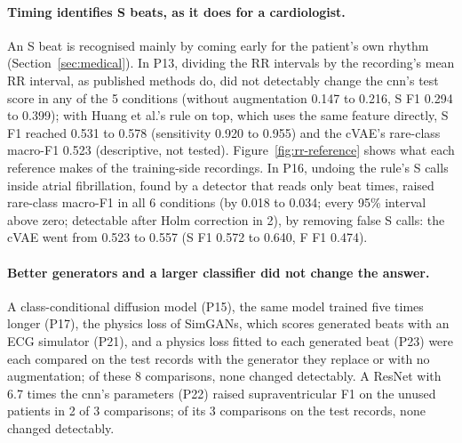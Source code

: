 \paragraph{Timing identifies S beats, as it does for a cardiologist.} An S beat is recognised mainly by coming early for the patient's own rhythm (Section~\ref{sec:medical}). In P13, dividing the RR intervals by the recording's mean RR interval, as published methods do, did not detectably change the cnn's test score in any of the 5 conditions (without augmentation 0.147 to 0.216, S F1 0.294 to 0.399); with Huang et al.'s rule on top, which uses the same feature directly, S F1 reached 0.531 to 0.578 (sensitivity 0.920 to 0.955) and the cVAE's rare-class macro-F1 0.523 (descriptive, not tested). Figure~\ref{fig:rr-reference} shows what each reference makes of the training-side recordings. In P16, undoing the rule's S calls inside atrial fibrillation, found by a detector that reads only beat times, raised rare-class macro-F1 in all 6 conditions (by 0.018 to 0.034; every 95\% interval above zero; detectable after Holm correction in 2), by removing false S calls: the cVAE went from 0.523 to 0.557 (S F1 0.572 to 0.640, F F1 0.474).

\paragraph{Better generators and a larger classifier did not change the answer.} A class-conditional diffusion model (P15), the same model trained five times longer (P17), the physics loss of SimGANs, which scores generated beats with an ECG simulator (P21), and a physics loss fitted to each generated beat (P23) were each compared on the test records with the generator they replace or with no augmentation; of these 8 comparisons, none changed detectably. A ResNet with 6.7 times the cnn's parameters (P22) raised supraventricular F1 on the unused patients in 2 of 3 comparisons; of its 3 comparisons on the test records, none changed detectably.

